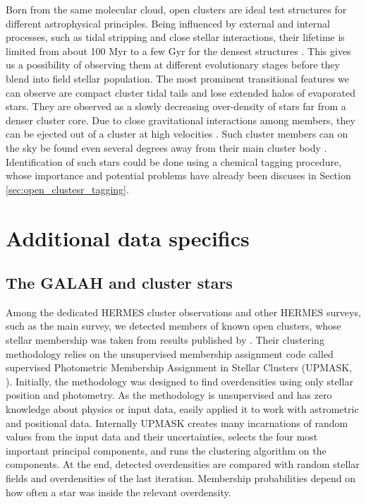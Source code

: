 Born from the same molecular cloud, open clusters are ideal test structures for different astrophysical principles. Being influenced by external and internal processes, such as tidal stripping and close stellar interactions, their lifetime is limited from about 100 Myr to a few Gyr for the densest structures \cite{1998A&A...337..363P, 2013MNRAS.434.2509M}. This gives us a possibility of observing them at different evolutionary stages \cite{2006BASI...34..153C, 2007A&A...468..139P} before they blend \cite{2001A&A...366..827B} into field stellar population. The most prominent transitional features we can observe are compact cluster tidal tails \cite{2019AA...627A...4R, 2019AJ....157..115Y, 2019AA...621L...3M, 2019arXiv191206657Z} and lose extended halos of evaporated stars. They are observed as a slowly decreasing over-density \cite{2002A&A...385..471C, 2004A&A...427..485B, 2019AA...627A.119C} of stars far from a denser cluster core. Due to close gravitational interactions among members, they can be ejected out of a cluster at high velocities \cite{2009MNRAS.396..570G, 2010MNRAS.402..105G, 2017MNRAS.470.3049R}. Such cluster members can on the sky be found even several degrees away from their main cluster body \cite{2007MNRAS.376L..29G, 2018MNRAS.473.4612K, 2019ApJ...884....6M}. Identification of such stars could be done using a chemical tagging procedure, whose importance and potential problems have already been discuses in Section \ref{sec:open_clustesr_tagging}. 

\section{Additional data specifics}
\label{sec:data_clusters}

\subsection{The GALAH and cluster stars}
\label{sec:galah_clusters}
Among the dedicated HERMES cluster observations and other HERMES surveys, such as the main \Gh survey, we detected members of known open clusters, whose stellar membership was taken from results published by \citet{2018A&A...618A..93C}. Their clustering methodology relies on the unsupervised membership assignment code called supervised Photometric Membership Assignment in Stellar Clusters (UPMASK, \cite{2014A&A...561A..57K}). Initially, the methodology was designed to find overdensities using only stellar position and photometry. As the methodology is unsupervised and has zero knowledge about physics or input data, \citet{2014A&A...561A..57K} easily applied it to work with astrometric and positional data. Internally UPMASK creates many incarnations of random values from the input data and their uncertainties, selects the four most important principal components, and runs the clustering algorithm on the components. At the end, detected overdensities are compared with random stellar fields and overdensities of the last iteration. Membership probabilities depend on how often a star was inside the relevant overdensity.

